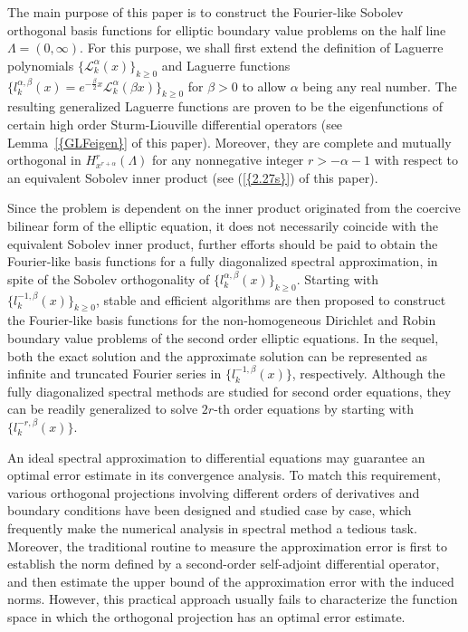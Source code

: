 \documentclass[10pt,reqno]{amsart}
\theoremstyle{remark}
\theoremstyle{definition}
\begin{document}
The main purpose  of this paper is to construct the   Fourier-like Sobolev orthogonal basis functions
\cite{FerMarPinXu,MarXu}  for elliptic boundary value problems on the half line $\Lambda=(0,\infty)$.  For this purpose, we shall first extend the definition of
 Laguerre polynomials $\big\{ \mathcal{L}^{\alpha}_k(x)\big\}_{ k\ge 0}$
 and Laguerre functions $\big\{ l^{\alpha,\beta}_k(x) = e^{-\frac{\beta}{2}x}  \mathcal{L}^{\alpha}_k(\beta x)  \big\}_{k\ge 0}$ for $\beta>0$  to allow $\alpha$ being any real number.
 The resulting generalized  Laguerre  functions
 are proven to be the eigenfunctions of certain high order  Sturm-Liouville differential operators (see {Lemma~{\rm \ref{{GLFeigen}}}} of this paper).
 Moreover, they  are  complete and mutually orthogonal in $H^r_{x^{r+\alpha}}(\Lambda)$
 for any nonnegative
 integer $r>-\alpha-1$  with respect to an equivalent Sobolev inner product (see {{\rm (\ref{{2.27s}})}} of this paper).

Since the problem is dependent  on the  inner product originated from
the coercive  bilinear form of the  elliptic equation, it does  not necessarily  coincide
with the equivalent Sobolev inner product,
further  efforts should
be  paid to obtain the Fourier-like basis functions for
a fully diagonalized spectral approximation,
in spite of the Sobolev orthogonality of $\big\{ l^{\alpha,\beta}_k(x)  \big\}_{k\ge 0}$.
Starting with $\big\{ l^{-1,\beta}_k(x)  \big\}_{k\ge 0}$,
stable and efficient algorithms are then proposed  to construct the Fourier-like basis functions
for the non-homogeneous Dirichlet and Robin boundary value problems of the second order
elliptic equations.
In the sequel, both the exact solution and the approximate solution can be represented  as
 infinite and truncated Fourier series in $\big\{ l^{-1,\beta}_k(x)  \big\}$, respectively.
Although the fully diagonalized spectral methods are studied   for second order equations,
they  can be  readily generalized  to solve $2r$-th order equations
by  starting with $\big\{ l^{-r,\beta}_k(x)  \big\}$.

An ideal spectral approximation to differential equations may guarantee an optimal error estimate in  its  convergence  analysis. To match this requirement,  various orthogonal projections involving  different orders of derivatives
and boundary conditions
  have been designed and studied case by case, which frequently make  the numerical analysis
in spectral method a  tedious
task.
Moreover, the  traditional routine to measure the approximation error is first to establish the norm defined by a second-order self-adjoint differential operator, and then estimate the upper bound of the approximation error  with the induced norms. However, this practical approach usually fails to characterize
the function space in which the orthogonal projection  has an optimal error estimate.
\end{document}
